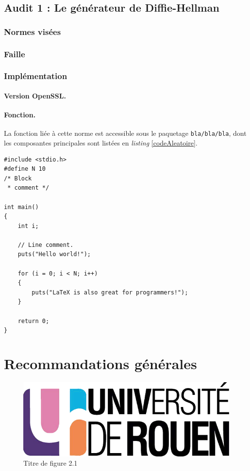 	
		
	\subsection{Audit 1 : Le générateur de Diffie-Hellman}
		\subsubsection{Normes visées}

	
		\subsubsection{Faille}
	
	
	
		\subsubsection{Implémentation}
		
			\paragraph{Version OpenSSL.\\}
		
			\paragraph{Fonction.\\}
		La fonction liée à cette norme est accessible sous le paquetage \texttt{bla/bla/bla}, dont les composantes principales sont listées en \textit{listing} \ref{codeAleatoire}.
		
		
		\begin{lstlisting}[style=customc,caption=codeAleatoire.c, label=codeAleatoire]
#include <stdio.h>
#define N 10
/* Block
 * comment */
 
int main()
{
    int i;
 
    // Line comment.
    puts("Hello world!");
 
    for (i = 0; i < N; i++)
    {
        puts("LaTeX is also great for programmers!");
    }
 
    return 0;
}
		\end{lstlisting}
		




\section{Recommandations générales}




\begin{figure}[H]
	\centering
	\includegraphics[scale=0.2]{images/logo_univ.png}
	\caption{Titre de figure 2.1}
	\label{fig21}
\end{figure}
